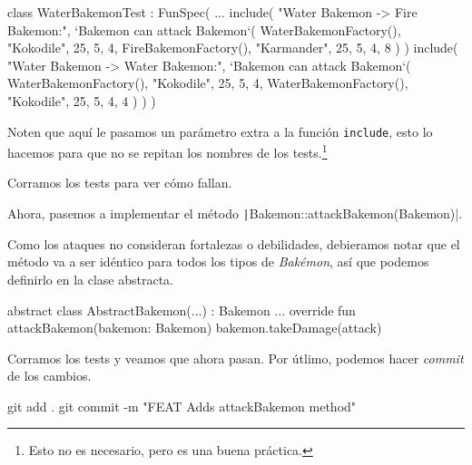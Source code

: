  \begin{kotlin}
    class WaterBakemonTest : FunSpec({
      ...
      include(
        "Water Bakemon -> Fire Bakemon:",
        `Bakemon can attack Bakemon`(
          WaterBakemonFactory(), "Kokodile", 25, 5, 4,
          FireBakemonFactory(), "Karmander", 25, 5, 4, 8
        )
      )
      include(
        "Water Bakemon -> Water Bakemon:",
        `Bakemon can attack Bakemon`(
          WaterBakemonFactory(), "Kokodile", 25, 5, 4,
          WaterBakemonFactory(), "Kokodile", 25, 5, 4, 4
        )
      )
    })
  \end{kotlin}

  Noten que aquí le pasamos un parámetro extra a la función \texttt{include}, esto lo hacemos para
  que no se repitan los nombres de los tests.\footnote{Esto no es necesario, pero es una buena 
  práctica.}
  
  Corramos los tests para ver cómo fallan.

  Ahora, pasemos a implementar el método \texttt|Bakemon::attackBakemon(Bakemon)|.

  Como los ataques no consideran fortalezas o debilidades, debieramos notar que el método
  va a ser idéntico para todos los tipos de \textit{Bakémon}, así que podemos definirlo en la
  clase abstracta.

  \begin{kotlin}
    abstract class AbstractBakemon(...) : Bakemon {
      ...
      override fun attackBakemon(bakemon: Bakemon) {
        bakemon.takeDamage(attack)
      }
    }
  \end{kotlin}

  Corramos los tests y veamos que ahora pasan.
  Por útlimo, podemos hacer \textit{commit} de los cambios.

  \begin{powershell}
    git add .
    git commit -m "FEAT Adds attackBakemon method"
  \end{powershell}
